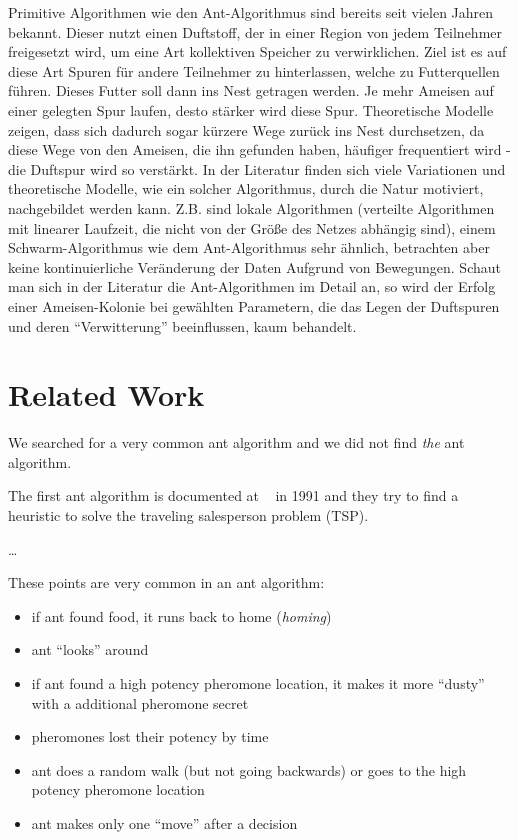 Primitive Algorithmen wie den Ant-Algorithmus sind bereits seit vielen
Jahren bekannt. Dieser nutzt einen Duftstoff, der in einer Region von
jedem Teilnehmer freigesetzt wird, um eine Art kollektiven Speicher zu
verwirklichen. Ziel ist es auf diese Art Spuren für andere Teilnehmer zu
hinterlassen, welche zu Futterquellen führen. Dieses Futter soll dann
ins Nest getragen werden. Je mehr Ameisen auf einer gelegten Spur
laufen, desto stärker wird diese Spur. Theoretische Modelle zeigen, dass
sich dadurch sogar kürzere Wege zurück ins Nest durchsetzen, da diese
Wege von den Ameisen, die ihn gefunden haben, häufiger frequentiert wird
- die Duftspur wird so verstärkt. In der Literatur finden sich viele
Variationen und theoretische Modelle, wie ein solcher Algorithmus, durch
die Natur motiviert, nachgebildet werden kann. Z.B. sind lokale
Algorithmen (verteilte Algorithmen mit linearer Laufzeit, die nicht von
der Größe des Netzes abhängig sind), einem Schwarm-Algorithmus wie dem
Ant-Algorithmus sehr ähnlich, betrachten aber keine kontinuierliche
Veränderung der Daten Aufgrund von Bewegungen. Schaut man sich in der
Literatur die Ant-Algorithmen im Detail an, so wird der Erfolg einer
Ameisen-Kolonie bei gewählten Parametern, die das Legen der Duftspuren
und deren ``Verwitterung'' beeinflussen, kaum behandelt.

\section{Related Work}\label{relatedWork}

We searched for a very common ant algorithm and we did not find
\emph{the} ant algorithm.

The first ant algorithm is documented at ~\cite{colorni1991} in 1991 and
they try to find a heuristic to solve the traveling salesperson problem
(TSP).

\ldots{}

These points are very common in an ant algorithm:

\begin{itemize}
\tightlist
\item
  if ant found food, it runs back to home (\emph{homing})
\item
  ant ``looks'' around
\item
  if ant found a high potency pheromone location, it makes it more
  ``dusty'' with a additional pheromone secret
\item
  pheromones lost their potency by time
\item
  ant does a random walk (but not going backwards) or goes to the high
  potency pheromone location
\item
  ant makes only one ``move'' after a decision
\end{itemize}

